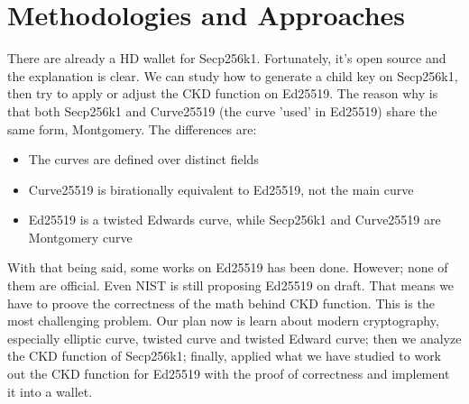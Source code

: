 \chapter{Methodologies and Approaches} \label{chap:Methodologies_and_Approaches}

There are already a HD wallet for Secp256k1. Fortunately, it's open source and the explanation is clear. We can study how to generate a child key on Secp256k1, then try to apply or adjust the CKD function on Ed25519. The reason why is that both Secp256k1 and Curve25519 (the curve 'used' in Ed25519) share the same form, Montgomery. The differences are:

\begin{itemize}
    \item The curves are defined over distinct fields
    \item Curve25519 is birationally equivalent to Ed25519, not the main curve
    \item Ed25519 is a twisted Edwards curve, while Secp256k1 and Curve25519 are \\ Montgomery curve
\end{itemize}

With that being said, some works on Ed25519 has been done. However; none of them are official. Even NIST is still proposing Ed25519 on draft. That means we have to proove the correctness of the math behind CKD function. This is the most challenging problem. Our plan now is learn about modern cryptography, especially elliptic curve, twisted curve and twisted Edward curve; then we analyze the CKD function of Secp256k1; finally, applied what we have studied to work out the CKD function for Ed25519 with the proof of correctness and implement it into a wallet.